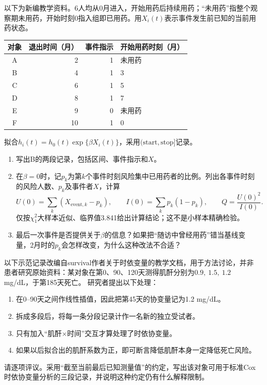 以下为新编教学资料。6人均从0月进入，开始用药后持续用药；“未用药”指整个观察期未用药，开始时刻0指入组即已用药。用$X_i(t)$表示事件发生前已知的当前用药状态。
\begin{center}\begin{tabular}{crrl}\toprule
对象 & 退出时间（月） & 事件指示 & 开始用药时刻（月）\\\midrule
A & 2 & 1 & 未用药\\
B & 4 & 1 & 3\\
C & 6 & 1 & 5\\
D & 8 & 1 & 7\\
E & 9 & 0 & 未用药\\
F & 10 & 1 & 0\\\bottomrule
\end{tabular}\end{center}
拟合$h_i(t)=h_0(t)\exp\{\beta X_i(t)\}$，采用$(\mathrm{start},\mathrm{stop}]$记录。
\begin{enumerate}
\item 写出B的两段记录，包括区间、事件指示和$X$。
\item 在$\beta=0$时，记$p_k$为第$k$个事件时刻风险集中已用药者的比例。列出各事件时刻的风险人数、$p_k$及事件者$X$，计算
\[
U(0)=\sum_k(X_{\mathrm{event},k}-p_k),\qquad
I(0)=\sum_k p_k(1-p_k),\qquad
Q=\frac{U(0)^2}{I(0)}.
\]
仅按$\chi^2_1$大样本近似、临界值3.841给出计算结论；这不是小样本精确检验。
\item 最后一次事件是否提供关于$\beta$的信息？如果把“随访中曾经用药”错当基线变量，2月时的$p_k$会怎样改变，为什么这种改法不合适？
\end{enumerate}

以下示范记录改编自survival作者关于时依变量的教学文档，用于方法讨论，并非患者研究原始资料：某对象在第0、90、120天测得肌酐分别为$0.9,\ 1.5,\ 1.2$ mg/dL，于第185天死亡。
研究者提出以下处理：
\begin{enumerate}
\item 在0--90天之间作线性插值，因此把第45天的协变量记为1.2 mg/dL。
\item 拆成多段后，将每一条分段记录计作一名新的独立受试者。
\item 只有加入“肌酐$\times$时间”交互才算处理了时依协变量。
\item 如果以后拟合出的肌酐系数为正，即可断言降低肌酐本身一定降低死亡风险。
\end{enumerate}
请逐项评议。采用“截至当前最后已知测量值”的约定，写出该对象可用于标准Cox时依协变量分析的三段记录，并说明这种约定仍有什么解释限制。
